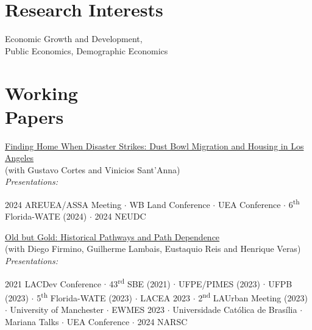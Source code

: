\documentclass[mm, 10pt]{simple_style}
\begin{document}
\begin{resume}
\section{Research Interests}

Economic Growth and Development,   \\
Public Economics, Demographic Economics


\section{Working \\ Papers \\ {\protect\footnotesize {}}}

\href{https://www.usf.edu/arts-sciences/departments/economics/documents/wpaper/2024-05.pdf}{Finding Home When Disaster Strikes: Dust Bowl Migration and Housing in Los Angeles} \\
(with Gustavo Cortes and Vinicios Sant'Anna) \\
\textit{Presentations:} 
\begin{minipage}[t]{0.7\textwidth}
2024 AREUEA/ASSA Meeting
$\cdot$ {WB Land Conference}
$\cdot$ {UEA Conference}
$\cdot$ {6\textsuperscript{th} Florida-WATE (2024)}
$\cdot$ {2024 NEUDC}

\end{minipage}

\href{https://papers.ssrn.com/sol3/papers.cfm?abstract_id=4513384}{Old but Gold: Historical Pathways and Path Dependence} \\
(with Diego Firmino, Guilherme Lambais, Eustaquio Reis and Henrique Veras) \\
\textit{Presentations:} 
\begin{minipage}[t]{0.7\textwidth}
2021 LACDev Conference
$\cdot$ 43\textsuperscript{rd} SBE (2021)
$\cdot$ UFPE/PIMES (2023)
$\cdot$ UFPB (2023)
$\cdot$ 5\textsuperscript{th} Florida-WATE (2023)
$\cdot$ {LACEA 2023}
$\cdot$ {2\textsuperscript{nd} LAUrban Meeting (2023)}
$\cdot$ University of Manchester
$\cdot$ {EWMES 2023}
$\cdot$ Universidade Cat\'olica de Bras\'ilia 
$\cdot$ Mariana Talks 
$\cdot$ {UEA Conference}
$\cdot$ {2024 NARSC}

\end{minipage}


\end{resume}
\end{document}
